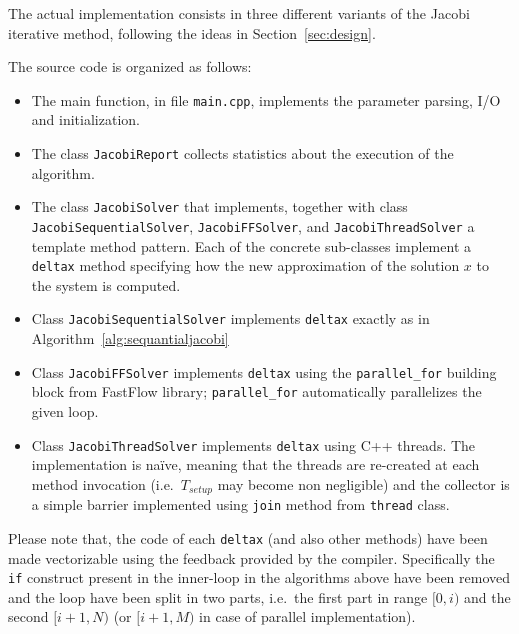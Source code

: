 The actual implementation consists in three different variants of the Jacobi iterative method, following the ideas in Section~\ref{sec:design}.

The source code is organized as follows:
\begin{itemize}
	\item The main function, in file \verb|main.cpp|, implements the parameter parsing, I/O and initialization.
	\item The class \verb|JacobiReport| collects statistics about the execution of the algorithm.
	\item The class \verb|JacobiSolver| that implements, together with class \verb|JacobiSequentialSolver|, \verb|JacobiFFSolver|, and \verb|JacobiThreadSolver| a template method pattern.
	Each of the concrete sub-classes implement a \verb|deltax| method specifying how the new approximation of the solution $x$ to the system is computed.
	\item Class \verb|JacobiSequentialSolver| implements \verb|deltax| exactly as in Algorithm~\ref{alg:sequantialjacobi}
	\item Class \verb|JacobiFFSolver| implements \verb|deltax| using the \verb|parallel_for| building block from FastFlow library; \verb|parallel_for| automatically parallelizes the given loop.
	\item Class \verb|JacobiThreadSolver| implements \verb|deltax| using C++ threads. The implementation is na\"ive, meaning that the threads are re-created at each method invocation (i.e.\ $T_{setup}$ may become non negligible)  and the collector is a simple barrier implemented using \verb|join| method from \verb|thread| class.
\end{itemize}

Please note that, the code of each \verb|deltax| (and also other methods) have been made vectorizable using the feedback provided by the compiler.
Specifically the \verb|if| construct present in the inner-loop in the algorithms above have been removed and the loop have been split in two parts, i.e.\ the first part in range $[0, i)$ and the second $[i+1, N)$ (or  $[i+1, M)$ in case of parallel implementation).